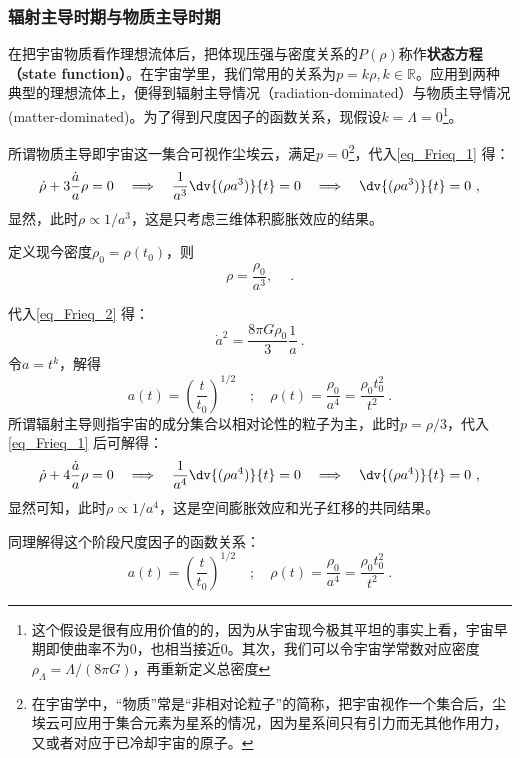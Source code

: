 \subsubsection{辐射主导时期与物质主导时期}
在把宇宙物质看作理想流体后，把体现压强与密度关系的$P(\rho)$称作\textbf{状态方程（state function）}。在宇宙学里，我们常用的关系为$p=k\rho,k\in \mathbb R$。应用到两种典型的理想流体上，便得到辐射主导情况（radiation-dominated）与物质主导情况(matter-dominated)。为了得到尺度因子的函数关系，现假设$k=\Lambda=0$\footnote{这个假设是很有应用价值的的，因为从宇宙现今极其平坦的事实上看，宇宙早期即使曲率不为0，也相当接近0。其次，我们可以令宇宙学常数对应密度$\rho_{\Lambda}=\Lambda/(8\pi G)$，再重新定义总密度}。

所谓物质主导即宇宙这一集合可视作尘埃云，满足$p=0$\footnote{在宇宙学中，“物质”常是“非相对论粒子”的简称，把宇宙视作一个集合后，尘埃云可应用于集合元素为星系的情况，因为星系间只有引力而无其他作用力，又或者对应于已冷却宇宙的原子。}，代入\autoref{eq_Frieq_1} 得：
\begin{equation}\dot{\rho}+3\frac{\dot{a}}{a}\rho=0\quad\Longrightarrow\quad\frac1{a^3}\dv{(\rho a^3)}{t}=0\quad\Longrightarrow\quad\dv{(\rho a^3)}{t}=0 ~,\end{equation}
显然，此时$\rho\propto 1/a^3$，这是只考虑三维体积膨胀效应的结果。

定义现今密度$\rho_0=\rho(t_0)$，则
\begin{equation}
\rho=\frac{\rho_0}{a^3},\quad ~.
\end{equation}

代入\autoref{eq_Frieq_2} 得：
\begin{equation}
\dot{a}^2=\frac{8\pi G\rho_0}3\frac1a ~.
\end{equation}
令$a=t^k$，解得
\begin{equation}a(t)=\left(\frac{t}{t_0}\right)^{1/2}\quad;\quad\rho(t)=\frac{\rho_0}{a^4}=\frac{\rho_0t_0^2}{t^2}~.\end{equation}
所谓辐射主导则指宇宙的成分集合以相对论性的粒子为主，此时$p=\rho/3$，代入\autoref{eq_Frieq_1} 后可解得：
\begin{equation}\dot{\rho}+4\frac{\dot{a}}{a}\rho=0\quad\Longrightarrow\quad\frac1{a^4}\dv{(\rho a^4)}{t}=0\quad\Longrightarrow\quad\dv{(\rho a^4)}{t} =0~,\end{equation}
显然可知，此时$\rho\propto  1/a^4$，这是空间膨胀效应和光子红移的共同结果。

同理解得这个阶段尺度因子的函数关系：
\begin{equation}
a(t)=\left(\frac{t}{t_0}\right)^{1/2}\quad;\quad\rho(t)=\frac{\rho_0}{a^4}=\frac{\rho_0t_0^2}{t^2} ~.
\end{equation}